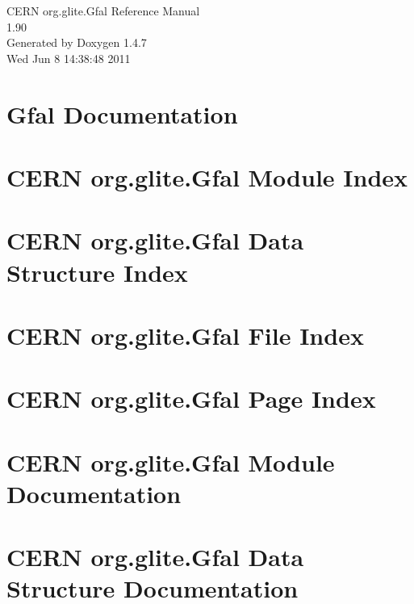 \documentclass[a4paper]{book}
\begin{document}
\begin{titlepage}
\vspace*{7cm}
\begin{center}
{\Large CERN org.glite.Gfal Reference Manual\\[1ex]\large 1.90 }\\
\vspace*{1cm}
{\large Generated by Doxygen 1.4.7}\\
\vspace*{0.5cm}
{\small Wed Jun 8 14:38:48 2011}\\
\end{center}
\end{titlepage}
\clearemptydoublepage
{}
\tableofcontents
\clearemptydoublepage
{}
\chapter{Gfal Documentation }
\label{index}
\chapter{CERN org.glite.Gfal Module Index}

\chapter{CERN org.glite.Gfal Data Structure Index}

\chapter{CERN org.glite.Gfal File Index}

\chapter{CERN org.glite.Gfal Page Index}

\chapter{CERN org.glite.Gfal Module Documentation}





\chapter{CERN org.glite.Gfal Data Structure Documentation}




\end{document}
